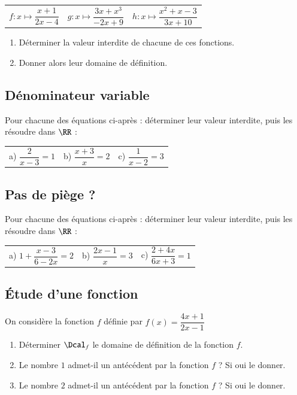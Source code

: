 \documentclass[oneside,12pt]{article}          %
\begin{document}
\begin{tabular}{p{} p{} p{}}
	$f : x \mapsto \dfrac{x + 1}{2x - 4}$ &
	$g : x \mapsto \dfrac{3x + x^3}{-2x + 9}$ &
	$h : x \mapsto \dfrac{x^2 + x - 3 }{3x + 10}$
\end{tabular}

\begin{enumerate}
	\item Déterminer la valeur interdite de chacune de ces fonctions.
	\item Donner alors leur domaine de définition.
\end{enumerate}



\subsection{Dénominateur variable}
Pour chacune des équations ci-après : déterminer leur valeur interdite, puis les résoudre dans $\RR$ :

\begin{tabular}{p{} p{} p{}}
	a) $\dfrac{2}{x - 3} = 1$ &
	b) $\dfrac{x + 3}{x} = 2$ &
	c) $\dfrac{1}{x - 2} = 3$
\end{tabular}



\subsection{Pas de piège ?}
Pour chacune des équations ci-après : déterminer leur valeur interdite, puis les résoudre dans $\RR$ :

\begin{tabular}{p{} p{} p{}}
	a) $1 + \dfrac{x - 3}{6 - 2x} = 2$ &
	b) $\dfrac{2x - 1}{x} = 3$ &
	c) $\dfrac{2 + 4x}{6x + 3} = 1$
\end{tabular}



\subsection{Étude d'une fonction}
On considère la fonction $f$ définie par $f(x) = \dfrac{4x + 1}{2x - 1}$
\begin{enumerate}
	\item Déterminer $\Dcal_f$ le domaine de définition de la fonction $f$.
	\item Le nombre $1$ admet-il un antécédent par la fonction $f$ ? Si oui le donner.
	\item Le nombre $2$ admet-il un antécédent par la fonction $f$ ? Si oui le donner.
\end{enumerate}
\end{document}

